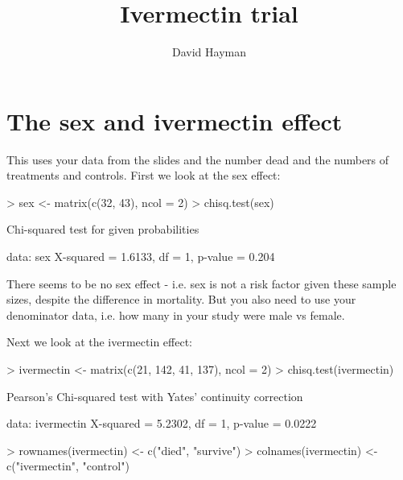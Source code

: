 \documentclass{article}
\begin{document}


\title{Ivermectin trial}
\author{David Hayman}





\maketitle


\section{The sex and ivermectin effect}

This uses your data from the slides and the number dead and the numbers of treatments and controls. First we look at the sex effect:

\begin{Schunk}
\begin{Sinput}
> sex <- matrix(c(32, 43), ncol = 2)
> chisq.test(sex)
\end{Sinput}
\begin{Soutput}
	Chi-squared test for given probabilities

data:  sex
X-squared = 1.6133, df = 1, p-value = 0.204
\end{Soutput}
\end{Schunk}

There seems to be no sex effect - i.e. sex is not a risk factor given these sample sizes, despite the difference in mortality. But you also need to use your denominator data, i.e. how many in your study were male vs female.

Next we look at the ivermectin effect:

\begin{Schunk}
\begin{Sinput}
> ivermectin <- matrix(c(21, 142, 41, 137), ncol = 2)
> chisq.test(ivermectin)
\end{Sinput}
\begin{Soutput}
	Pearson's Chi-squared test with Yates' continuity correction

data:  ivermectin
X-squared = 5.2302, df = 1, p-value = 0.0222
\end{Soutput}
\begin{Sinput}
> rownames(ivermectin) <- c("died", "survive")
> colnames(ivermectin) <- c("ivermectin", "control")
\end{Sinput}
\end{Schunk}
\end{document}
